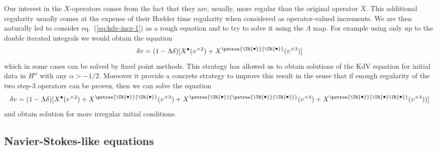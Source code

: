 \documentclass[a4paper,11pt,reqno]{article}
\newcommand{\1}{{\bf 1}}
\newcommand{\der}{\delta}
\newcommand{\tsnode}{\TR{\raisebox{0.5pt}{\ensuremath{\scriptstyle\bullet}}}}
\newcommand{\tsroot}{\ensuremath{\scriptstyle\bullet}}
\newcommand{\aaabbb}{\pstree{\tsnode}{\pstree{\tsnode}{\tsnode}}}
\newcommand{\aabb}{\pstree{\tsnode}{\tsnode}}
\newcommand{\aababb}{\pstree{\tsnode}{\tsnode \tsnode}}
\begin{document}
Our interest in the $X$-operators comes from the fact that they
are, usually,  more regular than the original operator $\dot X$. 
This additional regularity usually comes at the
expense of their H\oe lder time regularity when considered as 
operator-valued increments. We are then naturally led to consider
eq.~(\ref{eq:kdv-incr-1}) as a rough equation and to try to solve it
using the $\Lambda$ map. For example using only up to the double
iterated integrals we would obtain the equation
$$
\der v = (1-\Lambda \der)[X^{\tsroot}(v^{\times 2}) + X^{\aabb}(v^{\times 3})]
$$
which in some cases can be solved by fixed point methods.
This strategy has allowed us to obtain solutions of the KdV equation
for initial data in $H^{\alpha}$ with any $\alpha > -1/2$. Moreover it
provide a concrete strategy to improve this result in the sense that
if enough regularity of the two step-3 operators can be proven, then
we can solve the equation
$$
\der v = (1-\Lambda \der)[X^{\tsroot}(v^{\times 2}) +
X^{\aabb}(v^{\times 3}) +
X^{\aaabbb}(v^{\times 4}) +  X^{\aababb}(v^{\times 4}))]
$$
and  obtain solution for more irregular initial conditions.

\subsection{Navier-Stokes-like equations}
\end{document}
